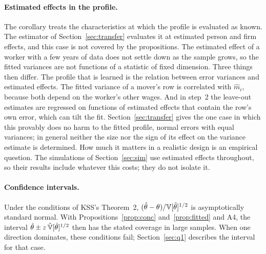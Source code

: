 \paragraph{Estimated effects in the profile.} The corollary treats the characteristics at which the profile is
evaluated as known. The estimator of Section~\ref{sec:transfer} evaluates it at estimated person and firm
effects, and this case is not covered by the propositions. The estimated effect of a worker with a few years
of data does not settle down as the sample grows, so the fitted variances are not functions of a statistic of
fixed dimension. Three things then differ. The profile that is learned is the relation between error variances
and estimated effects. The fitted variance of a mover's row is correlated with $\hat m_i$, because both depend on
the worker's other wages. And in step~2 the leave-out estimates are regressed on functions of estimated
effects that contain the row's own error, which can tilt the fit. Section~\ref{sec:transfer} gives the one case in
which this provably does no harm to the fitted profile, normal errors with equal variances; in general neither
the size nor the sign of its effect on the variance estimate is determined. How much it matters in a realistic
design is an empirical question. The simulations of Section~\ref{sec:sim} use estimated effects throughout, so
their results include whatever this costs; they do not isolate it.

\paragraph{Confidence intervals.} Under the conditions of KSS's Theorem~2,
$(\hat\theta-\theta)/\mathbb{V}[\hat\theta]^{1/2}$ is asymptotically standard normal. With
Propositions~\ref{prop:conc} and~\ref{prop:fitted} and A4, the interval
$\hat\theta\pm z\,\hat{\mathbb{V}}[\hat\theta]^{1/2}$ then has the stated coverage in large samples. When one direction
dominates, these conditions fail; Section~\ref{sec:q1} describes the interval for that case.
